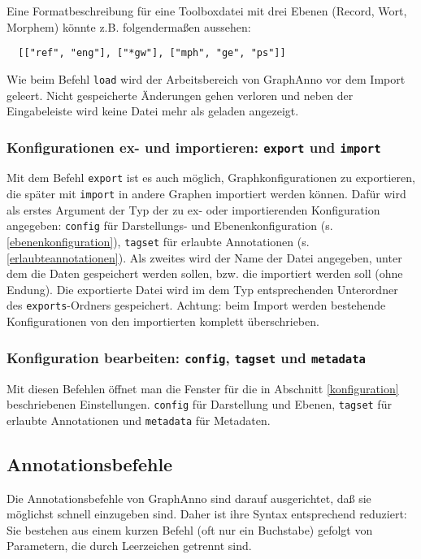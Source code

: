\documentclass[12pt]{scrartcl}
\begin{document}
Eine Formatbeschreibung für eine Toolboxdatei mit drei Ebenen (Record, Wort, Morphem) könnte z.B. folgendermaßen aussehen:
\begin{verbatim}
  [["ref", "eng"], ["*gw"], ["mph", "ge", "ps"]]
\end{verbatim}

Wie beim Befehl \texttt{load} wird der Arbeitsbereich von GraphAnno vor dem Import geleert. Nicht gespeicherte Änderungen gehen verloren und neben der Eingabeleiste wird keine Datei mehr als geladen angezeigt.


\subsubsection{Konfigurationen ex- und importieren: \texttt{export} und \texttt{import}}

Mit dem Befehl \texttt{export} ist es auch möglich, Graphkonfigurationen zu exportieren, die später mit \texttt{import} in andere Graphen importiert werden können. Dafür wird als erstes Argument der Typ der zu ex- oder importierenden Konfiguration angegeben: \texttt{config} für Darstellungs- und Ebenenkonfiguration (s. \ref{ebenenkonfiguration}), \texttt{tagset} für erlaubte Annotationen (s. \ref{erlaubteannotationen}). Als zweites wird der Name der Datei angegeben, unter dem die Daten gespeichert werden sollen, bzw. die importiert werden soll (ohne Endung). Die exportierte Datei wird im dem Typ entsprechenden Unterordner des \texttt{exports}-Ordners gespeichert. Achtung: beim Import werden bestehende Konfigurationen von den importierten komplett überschrieben.


\subsubsection{Konfiguration bearbeiten: \texttt{config}, \texttt{tagset} und \texttt{metadata}}

Mit diesen Befehlen öffnet man die Fenster für die in Abschnitt \ref{konfiguration} beschriebenen Einstellungen. \texttt{config} für Darstellung und Ebenen, \texttt{tagset} für erlaubte Annotationen und \texttt{metadata} für Metadaten.


\subsection{Annotationsbefehle}

Die Annotationsbefehle von GraphAnno sind darauf ausgerichtet, daß sie möglichst schnell einzugeben sind. Daher ist ihre Syntax entsprechend reduziert: Sie bestehen aus einem kurzen Befehl (oft nur ein Buchstabe) gefolgt von Parametern, die durch Leerzeichen getrennt sind.
\end{document}

